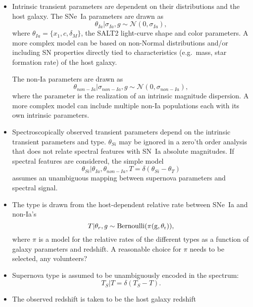 \documentclass[preprint,3p]{elsarticle}
\begin{document}
\begin{itemize}
\item Intrinsic transient parameters are dependent on their distributions and the host galaxy.
The SNe~Ia parameters are drawn as
\begin{equation}
\theta_{Ia} | \sigma_{Ia}, g \sim \mathcal{N}(0, \sigma_{Ia}),
\end{equation}
where $\theta_{Ia} =\{x_1, c, \delta_M\}$, the SALT2 light-curve shape and color parameters.
A more complex model can be based on non-Normal distributions
and/or including SN properties directly tied to characteristics (e.g.\ mass, star formation
rate) of the host galaxy.

The non-Ia parameters are drawn as
\begin{equation}
\theta_{non-Ia} | \sigma_{non-Ia}, g  \sim \mathcal{N}(0, \sigma_{non-Ia}),
\end{equation}
where the parameter is the realization of an intrinsic magnitude dispersion.
A more complex model can include multiple non-Ia populations each with its own
intrinsic parameters.
\item Spectroscopically observed transient parameters depend on the intrinsic transient
parameters and type.  $\theta_{Si}$ may be ignored in a zero'th order analysis that
does not relate spectral features with SN~Ia absolute magnitudes.   If spectral
features are considered, the simple model
\begin{equation}
\theta_{Si} | \theta_{Ia}, \theta_{non-Ia}, T = \delta(\theta_{Si}-\theta_T)
\end{equation}
assumes an unambiguous mapping between supernova parameters and spectral signal.
\item The type is drawn from the host-dependent relative rate between SNe~Ia and non-Ia's 
\begin{equation}
T | \theta_r, g \sim \rm{Bernoulli}(\pi(g,\theta_r)),
\end{equation}
where $\pi$ is a model for the relative rates of the different types as a
function of galaxy parameters and redshift.  A reasonable choice for $\pi$ needs to be
selected, any volunteers?
\item Supernova type is assumed to be unambiguously encoded in the
spectrum:
\begin{equation}
T_S | T  = \delta(T_S - T).
\end{equation}
\item The observed redshift is taken to be the host galaxy redshift
\begin{equation}

\end{equation}
\end{itemize}
\end{document}
